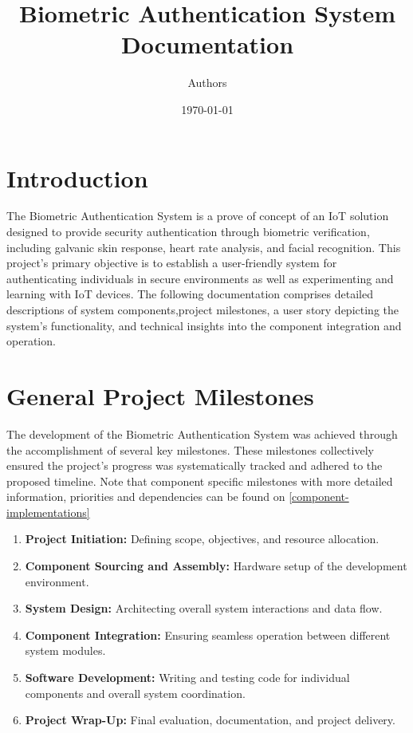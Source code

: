 \documentclass{article}
\title{Biometric Authentication System Documentation} \author{Authors}
\date{\today}
\begin{document}
\maketitle
\newpage
\tableofcontents
\listoffigures
\newpage

\section{Introduction}
The Biometric Authentication System is a prove of concept of an IoT
solution designed to provide security authentication through biometric verification, including
galvanic skin response, heart rate analysis, and facial recognition. This
project's primary objective is to establish a user-friendly system
for authenticating individuals in secure environments as well as experimenting and learning with IoT devices. The following
documentation comprises detailed descriptions of system components,project milestones, a user story depicting the system's functionality, and
technical insights into the component integration and operation.

\section{General Project Milestones} The development of the Biometric
Authentication System was achieved through the accomplishment of several key
milestones. These milestones collectively ensured the project's progress was
systematically tracked and adhered to the proposed timeline. Note that component specific milestones with more
detailed information, priorities and dependencies can be found on \autoref{component-implementations}

\begin{enumerate} 
    \item \textbf{Project Initiation:} Defining scope, objectives,
and resource allocation. 
\item \textbf{Component Sourcing and Assembly:} Hardware setup of the development environment. 
\item \textbf{System Design:} Architecting overall system interactions and data flow.
\item \textbf{Component Integration:} Ensuring seamless operation between
different system modules. 
\item \textbf{Software Development:} Writing and
testing code for individual components and overall system coordination. 
\item \textbf{Project Wrap-Up:} Final evaluation, documentation,
and project delivery. 
\end{enumerate}
\end{document}
